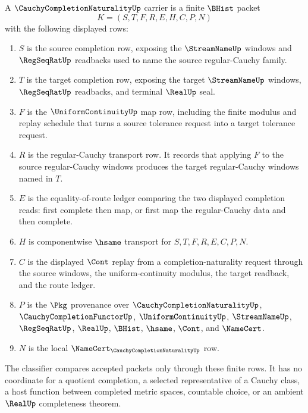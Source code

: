 \begin{definition}
\label{def:cauchy-complete-functor-law-carrier}
A $\CauchyCompletionNaturalityUp$ carrier is a finite $\BHist$ packet
$$
K=(S,T,F,R,E,H,C,P,N)
$$
with the following displayed rows:
\begin{enumerate}
\item $S$ is the source completion row, exposing the $\StreamNameUp$ windows and $\RegSeqRatUp$ readbacks used to name the source regular-Cauchy family.
\item $T$ is the target completion row, exposing the target $\StreamNameUp$ windows, $\RegSeqRatUp$ readbacks, and terminal $\RealUp$ seal.
\item $F$ is the $\UniformContinuityUp$ map row, including the finite modulus and replay schedule that turns a source tolerance request into a target tolerance request.
\item $R$ is the regular-Cauchy transport row. It records that applying $F$ to the source regular-Cauchy windows produces the target regular-Cauchy windows named in $T$.
\item $E$ is the equality-of-route ledger comparing the two displayed completion reads: first complete then map, or first map the regular-Cauchy data and then complete.
\item $H$ is componentwise $\hsame$ transport for $S,T,F,R,E,C,P,N$.
\item $C$ is the displayed $\Cont$ replay from a completion-naturality request through the source windows, the uniform-continuity modulus, the target readback, and the route ledger.
\item $P$ is the $\Pkg$ provenance over $\CauchyCompletionNaturalityUp$, $\CauchyCompletionFunctorUp$, $\UniformContinuityUp$, $\StreamNameUp$, $\RegSeqRatUp$, $\RealUp$, $\BHist$, $\hsame$, $\Cont$, and $\NameCert$.
\item $N$ is the local $\NameCert_{\CauchyCompletionNaturalityUp}$ row.
\end{enumerate}
The classifier compares accepted packets only through these finite rows. It has no coordinate for a quotient completion, a selected representative of a Cauchy class, a host function between completed metric spaces, countable choice, or an ambient $\RealUp$ completeness theorem.
\end{definition}

